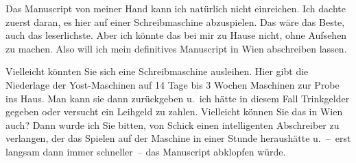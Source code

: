 \pstart
           Das Manuscript von meiner Hand
               kann ich natürlich nicht einreichen. Ich dachte zuerst daran, es hier auf einer
               Schreibmaschine abzuspielen. Das wäre das Beste, auch das leserlichste. Aber ich
               könnte das bei mir zu Hause nicht, ohne Aufsehen zu machen. Also will ich mein
               definitives Manuscript in Wien abschreiben lassen.\pend
           
\pstart
           Vielleicht könnten Sie sich eine Schreibmaschine ausleihen. Hier gibt die Niederlage
               der Yost-Maschinen auf 14 Tage bis 3 Wochen Maschinen zur Probe ins Haus. Man kann
               sie dann zurückgeben u. ich hätte in diesem Fall Trinkgelder gegeben oder versucht
               ein Leihgeld zu zahlen. Vielleicht können Sie das in Wien auch? Dann wurde ich Sie bitten, von Schick einen intelligenten Abschreiber zu verlangen, der das Spielen auf der
               Maschine in einer Stunde heraushätte u. – erst langsam dann immer schneller – das Manuscript abklopfen würde.\pend
           

